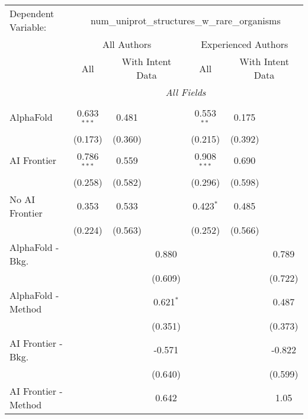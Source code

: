 \begingroup
\centering
\begin{tabular}{lcccccc}
   \tabularnewline \midrule \midrule
   Dependent Variable: & \multicolumn{6}{c}{num\_uniprot\_structures\_w\_rare\_organisms}\\
 & \multicolumn{3}{c}{All Authors} & \multicolumn{3}{c}{Experienced Authors} \\
\cmidrule(lr){2-4} \cmidrule(lr){5-7}
 & \multicolumn{1}{c}{All} & \multicolumn{2}{c}{With Intent Data} & \multicolumn{1}{c}{All} & \multicolumn{2}{c}{With Intent Data} \\
\cmidrule(lr){2-2} \cmidrule(lr){3-4} \cmidrule(lr){5-5} \cmidrule(lr){6-7}
 & \multicolumn{6}{c}{\textit{All Fields}} \\ \\
   AlphaFold               & 0.633$^{***}$ & 0.481   &             & 0.553$^{**}$  & 0.175   &   \\   
                           & (0.173)       & (0.360) &             & (0.215)       & (0.392) &   \\   
   AI Frontier             & 0.786$^{***}$ & 0.559   &             & 0.908$^{***}$ & 0.690   &   \\   
                           & (0.258)       & (0.582) &             & (0.296)       & (0.598) &   \\   
   No AI Frontier          & 0.353         & 0.533   &             & 0.423$^{*}$   & 0.485   &   \\   
                           & (0.224)       & (0.563) &             & (0.252)       & (0.566) &   \\   
   AlphaFold - Bkg.        &               &         & 0.880       &               &         & 0.789\\   
                           &               &         & (0.609)     &               &         & (0.722)\\   
   AlphaFold - Method      &               &         & 0.621$^{*}$ &               &         & 0.487\\   
                           &               &         & (0.351)     &               &         & (0.373)\\   
   AI Frontier - Bkg.      &               &         & -0.571      &               &         & -0.822\\   
                           &               &         & (0.640)     &               &         & (0.599)\\   
   AI Frontier - Method    &               &         & 0.642       &               &         & 1.05\\   

\end{tabular}
